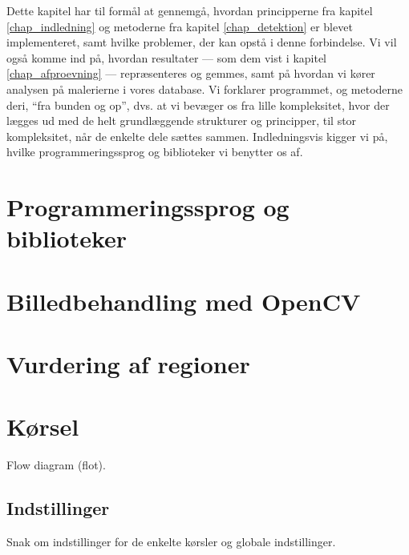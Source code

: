 {
{\sffamily Dette kapitel har til formål at gennemgå, hvordan
principperne fra kapitel \ref{chap_indledning} og metoderne fra kapitel
\ref{chap_detektion} er blevet implementeret, samt hvilke problemer, der
kan opstå i denne forbindelse. Vi vil også komme ind på, hvordan
resultater --- som dem vist i kapitel \ref{chap_afproevning} ---
repræsenteres og gemmes, samt på hvordan vi kører analysen på malerierne
i vores database.  Vi forklarer programmet, og metoderne deri, ``fra
bunden og op'', dvs. at vi bevæger os fra lille kompleksitet, hvor der
lægges ud med de helt grundlæggende strukturer og principper, til stor
kompleksitet, når de enkelte dele sættes sammen.  Indledningsvis kigger
vi på, hvilke programmeringssprog og biblioteker vi benytter os af.
}

\section{Programmeringssprog og biblioteker\label{section_programmeringssprog}}


\section{Billedbehandling med OpenCV\label{section_impBilledbehandling}}


\section{Vurdering af regioner\label{section_vurdering_regioner}}


\section{Kørsel\label{section_koersel}}
Flow diagram (flot).
\subsection{Indstillinger}
Snak om indstillinger for de enkelte kørsler og globale indstillinger.


}
